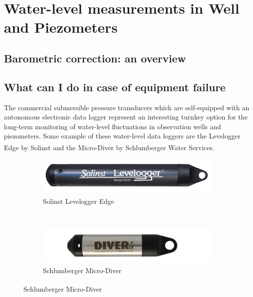 \documentclass[WHATMANUAL.tex]{subfiles}
\begin{document}
\chapter{Water-level measurements in Well and Piezometers}

\section{Barometric correction: an overview}

\section{What can I do in case of equipment failure}

The commercial submersible pressure transducers which are self-equipped with an autonomous electronic data logger represent an interesting turnkey option for the long-term monitoring of water-level fluctuations in observation wells and piezometers. Some example of these water-level data loggers are the Levelogger Edge\textsuperscript{\textregistered} by Solinst and the Micro-Diver\textsuperscript{\textregistered} by Schlumberger Water Services. 

\begin{figure}[!ht]
        \centering
        \begin{subfigure}[t]{0.5\textwidth}
                \includegraphics[width=\textwidth]{img/Solinst_EdgeLeveLogger}
                \caption{Solinst Levelogger Edge\textsuperscript{\textregistered}}
                \label{subfig:levelogger_solinst}                
        \end{subfigure}%
        \\[0.5cm]
        \begin{subfigure}[t]{0.5\textwidth}
                \includegraphics[width=\textwidth]{img/Schlumberger_MiniDiver_rescaled}
                \caption{Schlumberger Micro-Diver\textsuperscript{\textregistered}}
                \label{subfig:levelogger_schlumberger}
        \end{subfigure}       
\end{figure}
\end{document}
